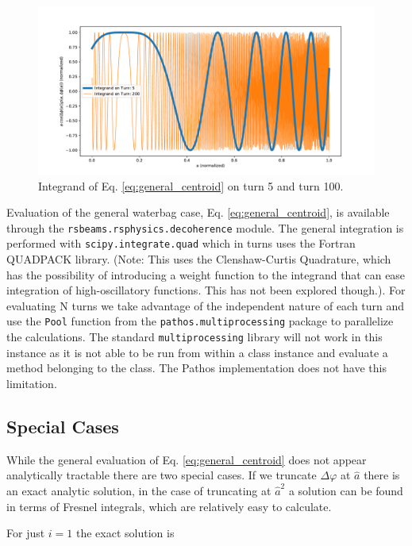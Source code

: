 \documentclass[]{article}
\begin{document}
\begin{figure}
	\centering
	\includegraphics[width=\columnwidth]{co_figures/integrand_oscillation.pdf}
	\caption{Integrand of Eq. \ref{eq:general_centroid} on turn 5 and turn 100.}
	\label{fig:integrand}
\end{figure}

Evaluation of the general waterbag case, Eq. \ref{eq:general_centroid}, is available through 
the \texttt{rsbeams.rsphysics.decoherence} module. The general integration is performed 
with \texttt{scipy.integrate.quad} which in turns uses the Fortran QUADPACK library. 
(Note: This uses the Clenshaw-Curtis Quadrature, which has the possibility of introducing 
a weight function to the integrand that can ease integration of high-oscillatory functions. 
This has not been explored though.). For evaluating N turns we take advantage of the 
independent nature of each turn and use the \texttt{Pool} function from the 
\texttt{pathos.multiprocessing} package to parallelize the calculations. The standard 
\texttt{multiprocessing} library will not work in this instance as it is not able to be run 
from within a class instance and evaluate a method belonging to the class. The Pathos 
implementation does not have this limitation.

\subsection{Special Cases}

While the general evaluation of Eq. \ref{eq:general_centroid} does not appear analytically 
tractable there are two special cases. If we truncate $\Delta \varphi$ at $\hat{a}$ there is 
an exact analytic solution, in the case of truncating at $\hat{a}^2$ a solution can be found 
in terms of Fresnel integrals, which are relatively easy to calculate.

For just $i=1$ the exact solution is
\end{document}
